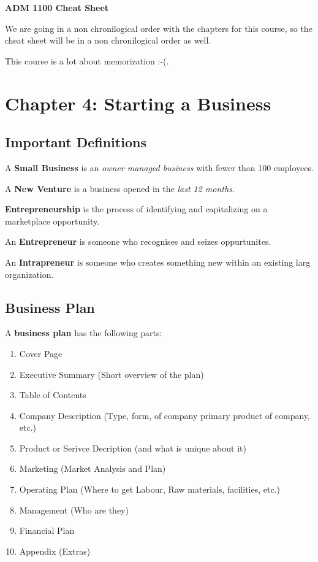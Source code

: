 \documentclass[12pt,letterpaper]{article} \usepackage{amsmath} \usepackage{graphicx} \usepackage[margin=1in]{geometry} \usepackage{longtable}  \usepackage{amssymb}
\begin{document}
	
	\begin{center}
		\Large\textbf{ADM 1100 Cheat Sheet} \\
		\vspace{0.5em}
	\end{center}
	
		We are going in a non chronilogical order with the chapters for this course, so the cheat sheet will be in a non chronilogical order as well.
		
		This course is a lot about memorization :-(. 
		
		\section{Chapter 4: Starting a Business}
		
		\subsection{Important Definitions}
		A \textbf{Small Business} is an \textit{owner managed business} with fewer than 100 employees. 
		
		A \textbf{New Venture} is a business opened in the \textit{last 12 months}.
		
		\textbf{Entrepreneurship} is the process of identifying and capitalizing on a marketplace opportunity. 
		
		An \textbf{Entrepreneur} is someone who recognises and seizes oppurtunites. 
		
		An \textbf{Intrapreneur} is someone who creates something new within an existing larg  organization. 
		
		\subsection{Business Plan}
		
		A \textbf{business plan} has the following parts:
		\begin{enumerate}[]\item Cover Page \item Executive Summary (Short overview of the plan)\item Table of Contents\item Company Description (Type, form, of company primary product of company, etc.)\item Product or Serivce Decription (and what is unique about it)\item Marketing (Market Analysis and Plan)\item Operating Plan (Where to get Labour, Raw materials, facilities, etc.)\item Management (Who are they)\item Financial Plan \item Appendix (Extras)\end{enumerate}
		
\end{document}
